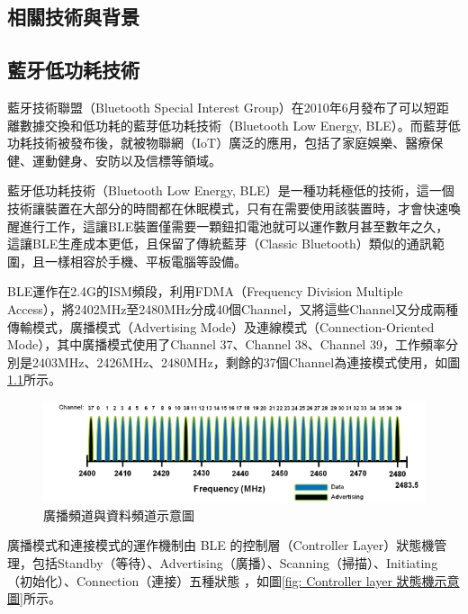 \begin{ZhChapter}

\chapter{相關技術與背景}

\section{藍牙低功耗技術}

藍牙技術聯盟（Bluetooth Special Interest Group）在2010年6月發布了可以短距離數據交換和低功耗的藍芽低功耗技術（Bluetooth Low Energy, BLE）。而藍芽低功耗技術被發布後，就被物聯網（IoT）廣泛的應用，包括了家庭娛樂、醫療保健、運動健身、安防以及信標等領域。

藍牙低功耗技術（Bluetooth Low Energy, BLE）是一種功耗極低的技術，這一個技術讓裝置在大部分的時間都在休眠模式，只有在需要使用該裝置時，才會快速喚醒進行工作，這讓BLE裝置僅需要一顆鈕扣電池就可以運作數月甚至數年之久，這讓BLE生產成本更低，且保留了傳統藍芽（Classic Bluetooth）類似的通訊範圍，且一樣相容於手機、平板電腦等設備。

BLE運作在2.4G的ISM頻段，利用FDMA（Frequency Division Multiple Access），將2402MHz至2480MHz分成40個Channel，又將這些Channel又分成兩種傳輸模式，廣播模式（Advertising Mode）及連線模式（Connection-Oriented Mode），其中廣播模式使用了Channel 37、Channel 38、Channel 39，工作頻率分別是2403MHz、2426MHz、2480MHz，剩餘的37個Channel為連接模式使用，如圖\ref{fig: 廣播頻道與資料頻道示意圖}所示。

\begin{figure}[htbp]
    \centering
    \includegraphics[width = 1\textwidth]{image/ble-phy-channel-assignment.png}
    \caption{廣播頻道與資料頻道示意圖\cite{microchip2023}}
    \label{fig: 廣播頻道與資料頻道示意圖}
\end{figure}

廣播模式和連接模式的運作機制由 BLE 的控制層（Controller Layer）狀態機管理，包括Standby（等待）、Advertising（廣播）、Scanning（掃描）、Initiating（初始化）、Connection（連接）五種狀態 ，如圖\ref{fig: Controller layer 狀態機示意圖}所示。


\end{ZhChapter}
